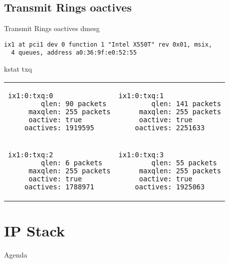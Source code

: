 \documentclass[14pt]{beamer}
\begin{document}
\subsection{Transmit Rings oactives}
\begin{frame}[fragile]{Transmit Rings oactives}
dmesg
\scriptsize
\begin{verbatim}
ix1 at pci1 dev 0 function 1 "Intel X550T" rev 0x01, msix,
  4 queues, address a0:36:9f:e0:52:55
\end{verbatim}
\normalsize
kstat txq
\\
\vspace{.3cm}
\scriptsize
\begin{tabular}{ll}
  \begin{minipage}{4.8cm}
  \begin{verbatim}
ix1:0:txq:0
        qlen: 90 packets
     maxqlen: 255 packets
     oactive: true
    oactives: 1919595
  \end{verbatim}
  \end{minipage}
  &
  \begin{minipage}{4.8cm}
  \begin{verbatim}
ix1:0:txq:1
        qlen: 141 packets
     maxqlen: 255 packets
     oactive: true
    oactives: 2251633
  \end{verbatim}
  \end{minipage}
  \\
  \begin{minipage}{4.8cm}
  \begin{verbatim}
ix1:0:txq:2
        qlen: 6 packets
     maxqlen: 255 packets
     oactive: true
    oactives: 1788971
  \end{verbatim}
  \end{minipage}
  &
  \begin{minipage}{4.8cm}
  \begin{verbatim}
ix1:0:txq:3
        qlen: 55 packets
     maxqlen: 255 packets
     oactive: true
    oactives: 1925063
  \end{verbatim}
  \end{minipage}
  \\
\end{tabular}
\end{frame}

\section{IP Stack}
\begin{frame}{Agenda}
\tableofcontents[currentsection]
\end{frame}
\end{document}
